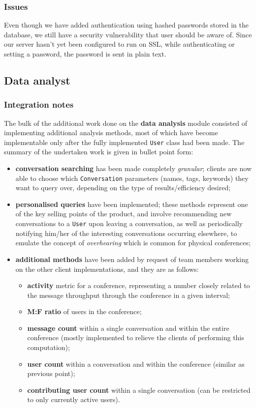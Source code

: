 \documentclass[12p, a4paper, onecolumn]{report}
\begin{document}
\subsubsection{Issues}

Even though we have added authentication using hashed passwords stored in the database, we still have a security vulnerability that user should be aware of. Since our server hasn’t yet been configured to run on SSL, while authenticating or setting a password, the password is sent in plain text.

\subsection{Data analyst}

\subsubsection{Integration notes}

The bulk of the additional work done on the \textbf{data analysis} module consisted of implementing additional analysis methods, most of which have become implementable only after the fully implemented \texttt{User} class had been made. The summary of the undertaken work is given in bullet point form:
\begin{itemize}
	\item \textbf{conversation searching} has been made completely \emph{granular}; clients are now able to choose which \texttt{Conversation} parameters (names, tags, keywords) they want to query over, depending on the type of results/efficiency desired;
	\item \textbf{personalised queries} have been implemented; these methods represent one of the key selling points of the product, and involve recommending new conversations to a \texttt{User} upon leaving a conversation, as well as periodically notifying him/her of the interesting conversations occurring elsewhere, to emulate the concept of \emph{overhearing} which is common for physical conferences;
	\item \textbf{additional methods} have been added by request of team members working on the other client implementations, and they are as follows:
		\begin{itemize}
			\item \textbf{activity} metric for a conference, representing a number closely related to the message throughput through the conference in a given interval;
			\item \textbf{M:F ratio} of users in the conference;
			\item \textbf{message count} within a single conversation and within the entire conference (mostly implemented to relieve the clients of performing this computation);
			\item \textbf{user count} within a conversation and within the conference (similar as previous point);
			\item \textbf{contributing user count} within a single conversation (can be restricted to only currently active users).
		\end{itemize}
\end{itemize}
\end{document}
